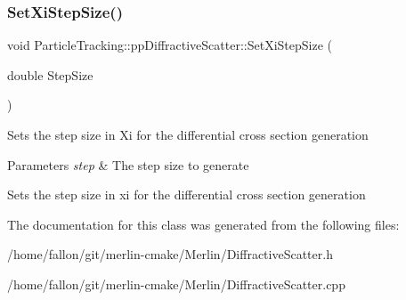 \subsubsection{\texorpdfstring{Set\+Xi\+Step\+Size()}{SetXiStepSize()}}
{\footnotesize\ttfamily void Particle\+Tracking\+::pp\+Diffractive\+Scatter\+::\+Set\+Xi\+Step\+Size (\begin{DoxyParamCaption}\item[{double}]{Step\+Size }\end{DoxyParamCaption})}

Sets the step size in Xi for the differential cross section generation 
\begin{DoxyParams}{Parameters}
{\em step} & The step size to generate\\
\hline
\end{DoxyParams}
Sets the step size in xi for the differential cross section generation 

The documentation for this class was generated from the following files\+:\begin{DoxyCompactItemize}
\item 
/home/fallon/git/merlin-\/cmake/\+Merlin/Diffractive\+Scatter.\+h\item 
/home/fallon/git/merlin-\/cmake/\+Merlin/Diffractive\+Scatter.\+cpp\end{DoxyCompactItemize}
